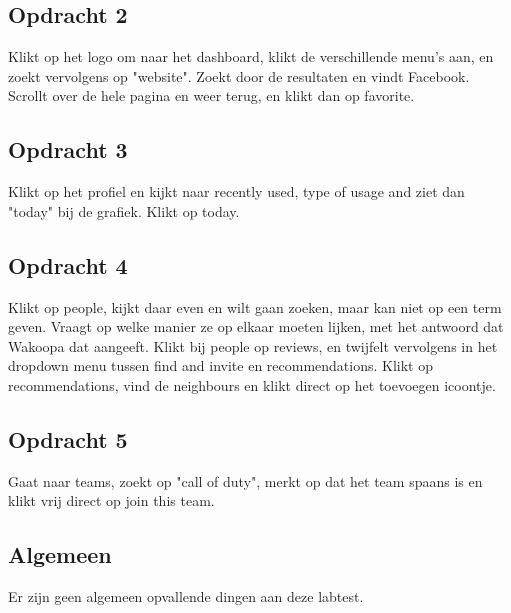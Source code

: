 \subsection{Opdracht 2}
Klikt op het logo om naar het dashboard, klikt de verschillende menu's aan, en zoekt vervolgens op "website". Zoekt door de resultaten en vindt Facebook. Scrollt over de hele pagina en weer terug, en klikt dan op favorite.

\subsection{Opdracht 3}
Klikt op het profiel en kijkt naar recently used, type of usage and ziet dan "today" bij de grafiek. Klikt op today.

\subsection{Opdracht 4}
Klikt op people, kijkt daar even en wilt gaan zoeken, maar kan niet op een term geven. Vraagt op welke manier ze op elkaar moeten lijken, met het antwoord dat Wakoopa dat aangeeft. Klikt bij people op reviews, en twijfelt vervolgens in het dropdown menu tussen find and invite en recommendations. Klikt op recommendations, vind de neighbours en klikt direct op het toevoegen icoontje.

\subsection{Opdracht 5}
Gaat naar teams, zoekt op "call of duty", merkt op dat het team spaans is en klikt vrij direct op join this team.

\subsection{Algemeen}
Er zijn geen algemeen opvallende dingen aan deze labtest.

